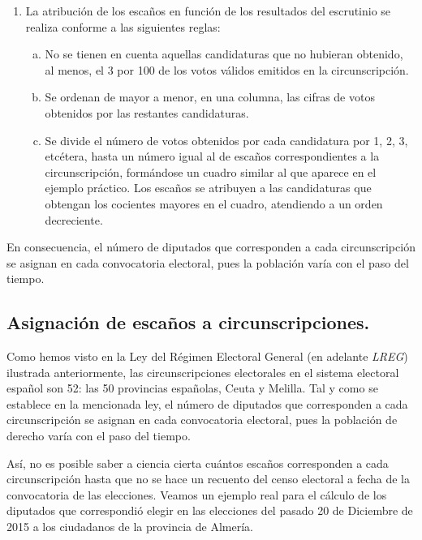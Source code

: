 \documentclass[11pt]{article}
\begin{document}
{\begin{leftbar}
		\begin{enumerate}
			\item La atribución de los escaños en función de los resultados del escrutinio se realiza conforme a las siguientes reglas:
			\begin{enumerate}[a)]
					\item No se tienen en cuenta aquellas candidaturas que no hubieran obtenido, al menos, el 3 por 100 de los votos válidos emitidos en la circunscripción.
					\item Se ordenan de mayor a menor, en una columna, las cifras de votos obtenidos por las restantes candidaturas.
					\item Se divide el número de votos obtenidos por cada candidatura por 1, 2, 3, etcétera, hasta un número igual al de escaños correspondientes a la circunscripción, formándose un cuadro similar al que aparece en el ejemplo práctico. Los escaños se atribuyen a las candidaturas que obtengan los cocientes mayores en el cuadro, atendiendo a un orden decreciente.
				\end{enumerate}
		\end{enumerate}

	\end{leftbar}
	}

	En consecuencia, el número de diputados que corresponden a cada circunscripción se asignan en cada convocatoria electoral, pues la población varía con el paso del tiempo.
	
	\subsection	{Asignación de escaños a circunscripciones.}
	
	Como hemos visto en la Ley del Régimen Electoral General (en adelante \textit{LREG}) ilustrada anteriormente, las circunscripciones electorales en el sistema electoral español son 52: las 50 provincias españolas, Ceuta y Melilla. Tal y como se establece en la mencionada ley, el número de diputados que corresponden a cada circunscripción se asignan en cada convocatoria electoral, pues la población de derecho varía con el paso del tiempo.
	
	Así, no es posible saber a ciencia cierta cuántos escaños corresponden a cada circunscripción hasta que no se hace un recuento del censo electoral a fecha de la convocatoria de las elecciones. Veamos un ejemplo real para el cálculo de los diputados que correspondió elegir en las elecciones del pasado 20 de Diciembre de 2015 a los ciudadanos de la provincia de Almería.
	
\end{document}
